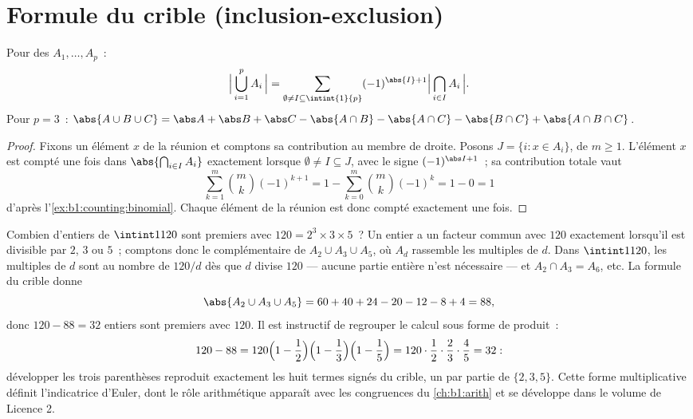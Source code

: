 \section{Formule du crible (inclusion-exclusion)}

\begin{theorem}\label{thm:b1:counting:inclexcl}
Pour des  $A_1, \dots, A_p$~:
\[
\Bigl|\, \bigcup_{i=1}^{p} A_i \,\Bigr|
= \sum_{\emptyset \neq I \subseteq \intint{1}{p}}
(-1)^{\abs{I}+1} \Bigl|\, \bigcap_{i \in I} A_i \,\Bigr| .
\]
Pour $p = 3$~:
$\abs{A \cup B \cup C} = \abs A + \abs B + \abs C - \abs{A \cap B} -
\abs{A \cap C} - \abs{B \cap C} + \abs{A \cap B \cap C}$.
\end{theorem}

\begin{proof}
Fixons un élément $x$ de la réunion et comptons sa contribution au
membre de droite. Posons $J = \{i : x \in A_i\}$, de  $m \geq
1$. L'élément $x$ est compté une fois dans $\abs{\bigcap_{i \in I} A_i}$
exactement lorsque $\emptyset \neq I \subseteq J$, avec le signe
$(-1)^{\abs I + 1}$~; sa contribution totale vaut
\[
\sum_{k=1}^{m} \binom{m}{k} (-1)^{k+1}
= 1 - \sum_{k=0}^{m} \binom mk (-1)^k = 1 - 0 = 1
\]
d'après l'\cref{ex:b1:counting:binomial}. Chaque élément de la réunion est
donc compté exactement une fois.
\end{proof}

\begin{example}\label{ex:b1:counting:coprime}
Combien d'entiers de $\intint1{120}$ sont premiers avec $120 = 2^3
\times 3 \times 5$~? Un entier a un facteur commun avec $120$ exactement
lorsqu'il est divisible par $2$, $3$ ou $5$~; comptons donc le
complémentaire de $A_2 \cup A_3 \cup A_5$, où $A_d$ rassemble les
multiples de $d$. Dans $\intint1{120}$, les multiples de $d$ sont au
nombre de $120/d$ dès que $d$ divise $120$ --- aucune partie entière
n'est nécessaire --- et $A_2 \cap A_3 = A_6$, etc. La formule du crible
donne
\[
\abs{A_2 \cup A_3 \cup A_5}
= 60 + 40 + 24 - 20 - 12 - 8 + 4 = 88 ,
\]
donc $120 - 88 = 32$ entiers sont premiers avec $120$. Il est
instructif de regrouper le calcul sous forme de produit~:
\[
120 - 88 = 120\Bigl(1 - \frac12\Bigr)\Bigl(1 -
\frac13\Bigr)\Bigl(1 - \frac15\Bigr) = 120 \cdot \frac12 \cdot
\frac23 \cdot \frac45 = 32 :
\]
développer les trois parenthèses reproduit exactement les huit termes
signés du crible, un par partie de $\{2, 3, 5\}$. Cette forme
multiplicative définit l'indicatrice d'Euler, dont le rôle arithmétique
apparaît avec les congruences du \cref{ch:b1:arith} et se développe
dans le volume de Licence 2.
\end{example}


